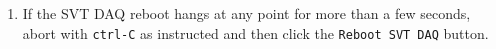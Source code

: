 \documentclass[letter,12pt]{article}
\begin{document}
\begin{enumerate}
\item 
\begin{minipage}[t]{0.35\textwidth}
If the SVT DAQ reboot hangs at any point for more than a few seconds, abort with \texttt{ctrl-C} as instructed and then click the \texttt{Reboot SVT DAQ} button.
\end{minipage}
\begin{minipage}[t]{0.4\textwidth}
\end{minipage}
\begin{minipage}[t]{0.15\textwidth}
\end{minipage}


\end{enumerate}
\end{document}
